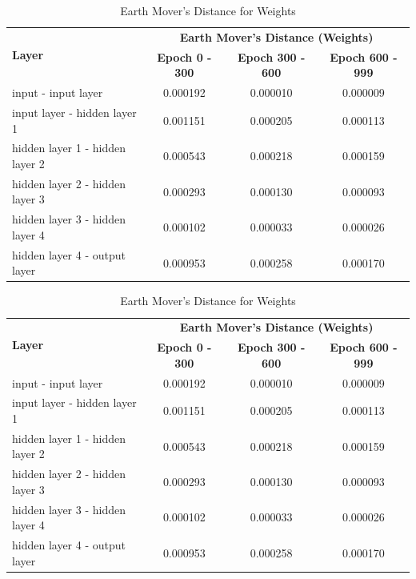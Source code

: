\documentclass{ioereport}
\begin{document}
    \begin{table}[H]
    \centering
    \begin{tabular}{|l|c|c|c|}
    \hline
    \multirow{2}{*}{\textbf{Layer}} & \multicolumn{3}{|c|}{\textbf{Earth Mover's Distance (Weights)}} \\
    \cline{2-4}
    & \textbf{Epoch 0 - 300} & \textbf{Epoch 300 - 600} & \textbf{Epoch 600 - 999} \\
    \hline
    input - input layer & 0.000192 & 0.000010 & 0.000009 \\
    input layer - hidden layer 1 & 0.001151 & 0.000205 & 0.000113 \\
    hidden layer 1 - hidden layer 2 & 0.000543 & 0.000218 & 0.000159 \\
    hidden layer 2 - hidden layer 3 & 0.000293 & 0.000130 & 0.000093 \\
    hidden layer 3 - hidden layer 4 & 0.000102 & 0.000033 & 0.000026 \\
    hidden layer 4 - output layer & 0.000953 & 0.000258 & 0.000170 \\
    \hline
    \end{tabular}
    \caption{Earth Mover's Distance for Weights}
    \end{table}

    \begin{table}[H]
    \centering
    \begin{tabular}{|l|c|c|c|}
    \hline
    \multirow{2}{*}{\textbf{Layer}} & \multicolumn{3}{|c|}{\textbf{Earth Mover's Distance (Weights)}} \\
    \cline{2-4}
    & \textbf{Epoch 0 - 300} & \textbf{Epoch 300 - 600} & \textbf{Epoch 600 - 999} \\
    \hline
    input - input layer & 0.000192 & 0.000010 & 0.000009 \\
    input layer - hidden layer 1 & 0.001151 & 0.000205 & 0.000113 \\
    hidden layer 1 - hidden layer 2 & 0.000543 & 0.000218 & 0.000159 \\
    hidden layer 2 - hidden layer 3 & 0.000293 & 0.000130 & 0.000093 \\
    hidden layer 3 - hidden layer 4 & 0.000102 & 0.000033 & 0.000026 \\
    hidden layer 4 - output layer & 0.000953 & 0.000258 & 0.000170 \\
    \hline
    \end{tabular}
    \caption{Earth Mover's Distance for Weights}
    \end{table}
\end{document}
